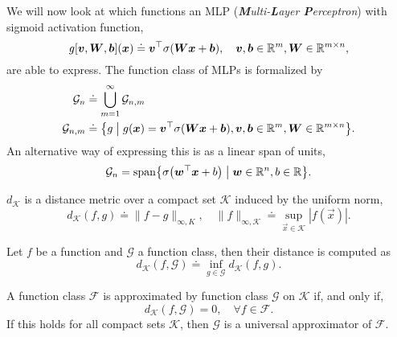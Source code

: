 
We will now look at which functions an MLP (\textit{\textbf{M}ulti-\textbf{L}ayer
    \textbf{P}erceptron}) with sigmoid activation function, \[
    g[\bm{v},\bm{W},\bm{b}](\bm{x}) \doteq \bm{v}^\top \sigma(\bm{W}\bm{x} + \bm{b}), \quad \bm{v}, \bm{b} \in \mathbb{R}^m, \bm{W} \in \mathbb{R}^{m\times n},
\]
are able to express. The function class of MLPs is formalized by
\begin{align*}
    \mathcal{G}_n     & \doteq \bigcup_{m=1}^\infty \mathcal{G}_{n,m}                                                                                                                 \\
    \mathcal{G}_{n,m} & \doteq \lft\{ g \;\middle|\; g(\vec{x}) = \transpose{\vec{v}} \sigma(\mat{W}\vec{x} + \vec{b}), \vec{v}, \vec{b} \in \R^m, \mat{W} \in \R^{m\times n} \rgt\}.
\end{align*}
An alternative way of expressing this is as a linear span of units, \[
    \mathcal{G}_n = \mathrm{span} \lft\{ \sigma \lft( \transpose{\vec{w}}\vec{x} + b \rgt) \;\middle|\; \vec{w} \in \R^n, b \in \R \rgt\}.
\]

\begin{definition}
    $d_{\mathcal{K}}$ is a distance metric over a compact set $\mathcal{K}$ induced by the uniform norm, \[
        d_{\mathcal{K}}(f,g) \doteq \| f - g \|_{\infty,K}, \quad \| f \|_{\infty,\mathcal{K}} \doteq \sup_{\vec{x} \in \mathcal{K}} |f(\vec{x})|.
    \]
\end{definition}

\begin{definition}
    Let $f$ be a function and $\mathcal{G}$ a function class, then their distance is computed as \[
        d_{\mathcal{K}}(f,\mathcal{G}) \doteq \inf_{g \in \mathcal{G}} d_{\mathcal{K}}(f,g).
    \]
\end{definition}

\begin{definition}
    A function class $\mathcal{F}$ is approximated by function class $\mathcal{G}$ on $\mathcal{K}$ if, and only if, \[
        d_{\mathcal{K}}(f, \mathcal{G}) = 0, \quad \forall f \in \mathcal{F}.
    \]
    If this holds for all compact sets $\mathcal{K}$, then $\mathcal{G}$ is a universal approximator of
    $\mathcal{F}$.
\end{definition}

